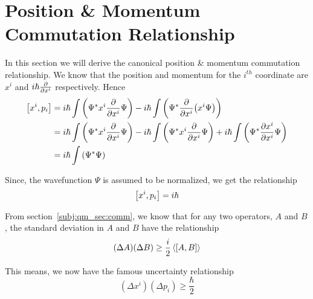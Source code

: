 \section{Position \& Momentum Commutation Relationship}{\label{subj:qm_sec:comm}}

In this section we will derive the canonical position \& momentum
commutation relationship. We know that the position and momentum for the $i^{th}$ coordinate are $x^i$ and $i\hbar\pdv{x^i}$ respectively. Hence
\begin{equation*}
  \begin{split}
    \commutator{x^i}{p_i} & = i\hbar\int \left(  \Psi^* x^i \pdv{x^i} \Psi \right) - i\hbar\int \left(  \Psi^* \pdv{x^i}(x^i \Psi) \right) \\
    & = i\hbar\int \left(  \Psi^* x^i \pdv{x^i} \Psi \right) - i\hbar\int \left(  \Psi^* x^i \pdv{x^i} \Psi \right) + i\hbar\int \left(  \Psi^* \pdv{x^i}{x^i} \Psi \right) \\
    & = i\hbar\int \left(\Psi^*\Psi\right)
  \end{split}
\end{equation*}

Since, the wavefunction $\Psi$ is assumed to be normalized, we get the
relationship
\[
\commutator{x^i}{p_i} = i\hbar
\]

From section~\ref{subj:qm_sec:comm}, we know that for any two
operators, $A$ and $B$, the standard deviation in $A$ and $B$ have the
relationship
\[
    (\Delta A)(\Delta B) \ge \frac{i}{2}\expval{\commutator{A}{B}}
\]

This means, we now have the famous uncertainty relationship
\[
(\Delta x^i)(\Delta p_i) \ge \frac{\hbar}{2}
\]
